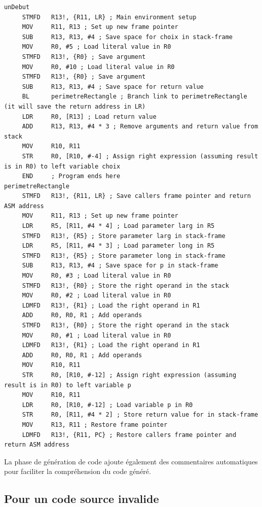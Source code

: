 \documentclass[french,a4paper]{article}
\begin{document}
    \begin{lstlisting}
unDebut
	 STMFD   R13!, {R11, LR} ; Main environment setup
	 MOV     R11, R13 ; Set up new frame pointer
	 SUB     R13, R13, #4 ; Save space for choix in stack-frame
	 MOV     R0, #5 ; Load literal value in R0
	 STMFD   R13!, {R0} ; Save argument
	 MOV     R0, #10 ; Load literal value in R0
	 STMFD   R13!, {R0} ; Save argument
	 SUB     R13, R13, #4 ; Save space for return value
	 BL      perimetreRectangle ; Branch link to perimetreRectangle (it will save the return address in LR)
	 LDR     R0, [R13] ; Load return value
	 ADD     R13, R13, #4 * 3 ; Remove arguments and return value from stack
	 MOV     R10, R11
	 STR     R0, [R10, #-4] ; Assign right expression (assuming result is in R0) to left variable choix
	 END     ; Program ends here
perimetreRectangle
	 STMFD   R13!, {R11, LR} ; Save callers frame pointer and return ASM address
	 MOV     R11, R13 ; Set up new frame pointer
	 LDR     R5, [R11, #4 * 4] ; Load parameter larg in R5
	 STMFD   R13!, {R5} ; Store parameter larg in stack-frame
	 LDR     R5, [R11, #4 * 3] ; Load parameter long in R5
	 STMFD   R13!, {R5} ; Store parameter long in stack-frame
	 SUB     R13, R13, #4 ; Save space for p in stack-frame
	 MOV     R0, #3 ; Load literal value in R0
	 STMFD   R13!, {R0} ; Store the right operand in the stack
	 MOV     R0, #2 ; Load literal value in R0
	 LDMFD   R13!, {R1} ; Load the right operand in R1
	 ADD     R0, R0, R1 ; Add operands
	 STMFD   R13!, {R0} ; Store the right operand in the stack
	 MOV     R0, #1 ; Load literal value in R0
	 LDMFD   R13!, {R1} ; Load the right operand in R1
	 ADD     R0, R0, R1 ; Add operands
	 MOV     R10, R11
	 STR     R0, [R10, #-12] ; Assign right expression (assuming result is in R0) to left variable p
	 MOV     R10, R11
	 LDR     R0, [R10, #-12] ; Load variable p in R0
	 STR     R0, [R11, #4 * 2] ; Store return value for in stack-frame
	 MOV     R13, R11 ; Restore frame pointer
	 LDMFD   R13!, {R11, PC} ; Restore callers frame pointer and return ASM address
    \end{lstlisting}

    La phase de génération de code ajoute également des commentaires automatiques pour faciliter la compréhension du code généré. \\

    \subsection{Pour un code source invalide}\label{subsec:pour-un-code-source-invalide}
\end{document}
